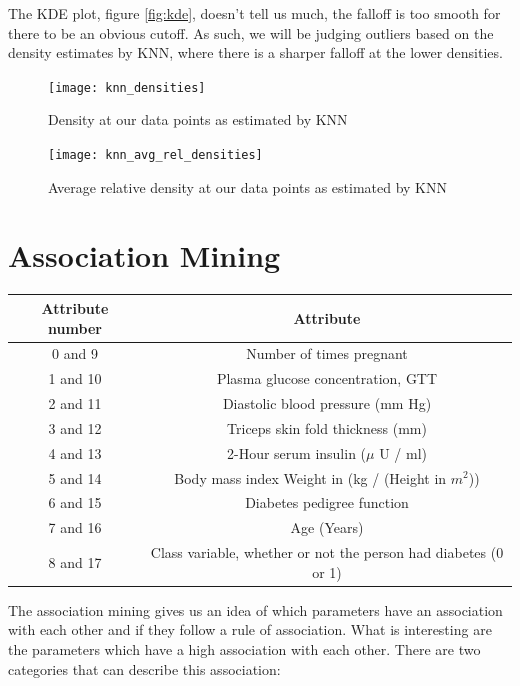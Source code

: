 The KDE plot, figure \ref{fig:kde},
doesn't tell us much,
the falloff is too smooth
for there to be an obvious cutoff.
As such,
we will be judging outliers based on the
density estimates by KNN,
where there is a sharper falloff at the lower densities.

\begin{figure}[htb]
  \centering
  \texttt{[image: knn\_densities]}
  \caption{Density at our data points as estimated by KNN}
  \label{fig:knn}
\end{figure}

\begin{figure}[htb]
  \centering
  \texttt{[image: knn\_avg\_rel\_densities]}
  \caption{Average relative density at our data points as estimated by KNN}
  \label{fig:knn-avg-rel}
\end{figure}

\section{Association Mining}

\begin{center}
 \begin{tabular}{||c c||}
 \hline
 Attribute number & Attribute \\ [0.5ex]
 \hline\hline
 0 and 9 & Number of times pregnant \\
 \hline
 1 and 10 & Plasma glucose concentration, GTT \\
 \hline
 2 and 11 & Diastolic blood pressure (mm Hg) \\
 \hline
 3 and 12 & Triceps skin fold thickness (mm) \\
 \hline
 4 and 13 & 2-Hour serum insulin ($\mu$ U / ml) \\
 \hline
 5 and 14 & Body mass index Weight in (kg / (Height in $m^2$)) \\
 \hline
 6 and 15 & Diabetes pedigree function \\
 \hline
 7 and 16 & Age (Years) \\
 \hline
 8 and 17 & Class variable, whether or not the person had diabetes (0 or 1) \\ [1ex]
 \hline
\end{tabular}
\end{center}

The association mining gives us an idea of which parameters have an association with each other and if they follow a rule of association.
What is interesting are the parameters which have a high association with each other.
There are two categories that can describe this association:

